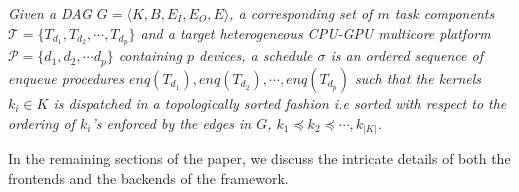 	\begin{definition}\emph{
		Given a DAG $G = \langle K,B,E_I,E_O,E \rangle$,  a corresponding set of $m$ task components $\mathcal{T} = \lbrace T_{d_1}, T_{d_2}, \cdots, T_{d_p}\rbrace$ and a target heterogeneous CPU-GPU multicore platform $\mathcal{P} = \{d_1,d_2,\cdots d_p \}$ containing $p$ devices, a schedule $\sigma$ is an ordered sequence of enqueue procedures $enq(T_{d_1}), enq(T_{d_2}),\cdots,enq(T_{d_p})$ such that the kernels $k_i \in K$ is dispatched in a topologically sorted fashion i.e sorted with respect to the ordering of $k_i$'s enforced by the edges in $G$,  $k_1 \preceq k_2 \preceq \cdots, k_{|K|}$. } 
	\end{definition}
	\par In the remaining sections of the paper, we discuss the intricate details of both the frontends and the backends of the framework.